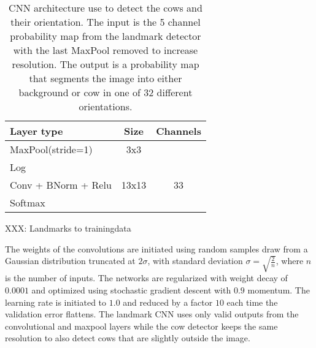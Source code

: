 \documentclass[10pt,a4paper,twocolumn]{article}
\begin{document}
\begin{table}
\begin{center}
\begin{tabular}{|l|c|c|}
\hline 
\textbf{Layer type} & \textbf{Size} & \textbf{Channels} \\ 
\hline 

MaxPool(stride=1) & 3x3 &  \\ 
Log & & \\
Conv + BNorm + Relu & 13x13 & 33 \\ 
Softmax & & \\
\hline 
\end{tabular}
\end{center}
\caption{CNN architecture use to detect the cows and their orientation. The input is the 5 channel probability map from the landmark detector with the last MaxPool removed to increase resolution. The output is a probability map that segments the image into either background or cow in one of 32 different orientations.}
\label{tab:cowdirnet}
\end{table}

XXX: Landmarks to trainingdata

The weights of the convolutions are initiated using random samples draw from a Gaussian 
distribution truncated at $2\sigma$, with standard deviation $\sigma=\sqrt{\frac{2}{n}}$, 
where $n$ is the number of inputs. The networks are regularized with weight decay of 
$0.0001$ and optimized using stochastic gradient descent with $0.9$ momentum. The 
learning rate is initiated to $1.0$ and reduced by a factor $10$ each time the validation 
error flattens. The landmark CNN uses only valid outputs from the convolutional and maxpool 
layers while the cow detector keeps the same resolution to also detect cows that are 
slightly outside the image.
\end{document}
